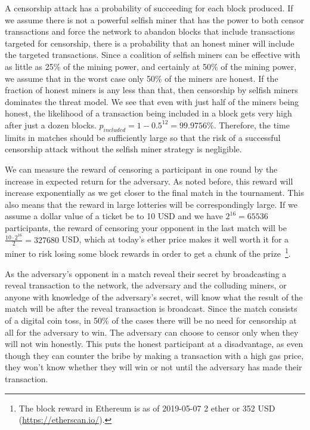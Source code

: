 A censorship attack has a probability of succeeding for each block produced. If we assume there is not a powerful selfish miner that has the power to both censor transactions and force the network to abandon blocks that include transactions targeted for censorship, there is a probability that an honest miner will include the targeted transactions. Since a coalition of selfish miners can be effective with as little as 25\% of the mining power, and certainly at 50\% of the mining power, we assume that in the worst case only 50\% of the miners are honest. If the fraction of honest miners is any less than that, then censorship by selfish miners dominates the threat model. We see that even with just half of the miners being honest, the likelihood of a transaction being included in a block gets very high after just a dozen blocks. $p_{included} = 1-0.5^{12}=99.9756\%$. Therefore, the time limits in matches should be sufficiently large so that the risk of a successful censorship attack without the selfish miner strategy is negligible.

We can measure the reward of censoring a participant in one round by the increase in expected return for the adversary. As noted before, this reward will increase exponentially as we get closer to the final match in the tournament. This also means that the reward in large lotteries will be correspondingly large. If we assume a dollar value of a ticket be to 10 USD and we have $2^{16}=65536$ participants, the reward of censoring your opponent in the last match will be $\frac{10 \cdot 2^{16}}{2}=327680$ USD, which at today's ether price makes it well worth it for a miner to risk losing some block rewards in order to get a chunk of the prize~\footnote{The block reward in Ethereum is as of 2019-05-07 2 ether or 352 USD (\url{https://etherscan.io/}).}.

As the adversary's opponent in a match reveal their secret by broadcasting a reveal transaction to the network, the adversary and the colluding miners, or anyone with knowledge of the adversary's secret, will know what the result of the match will be after the reveal transaction is broadcast. Since the match consists of a digital coin toss, in 50\% of the cases there will be no need for censorship at all for the adversary to win. The adversary can choose to censor only when they will not win honestly. This puts the honest participant at a disadvantage, as even though they can counter the bribe by making a transaction with a high gas price, they won't know whether they will win or not until the adversary has made their transaction.

